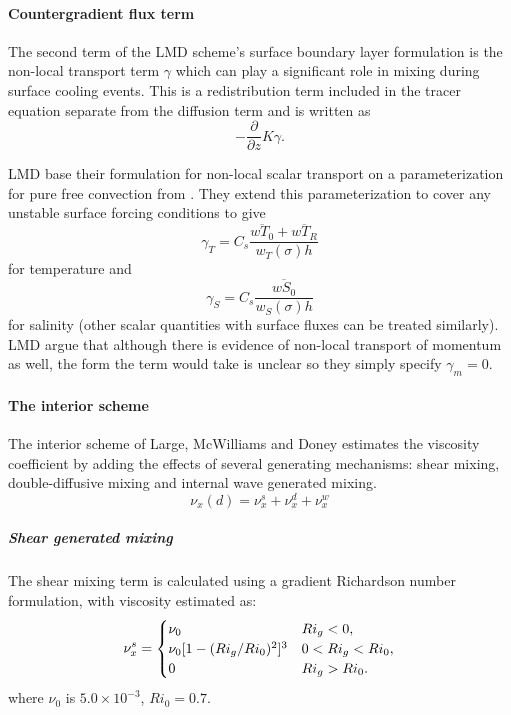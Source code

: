\paragraph{Countergradient flux term}
The second term of the LMD scheme's surface boundary layer
formulation is the non-local transport term $\gamma$ which can play a
significant role in mixing during surface cooling events.  This is a
redistribution term included in the tracer equation separate from the
diffusion term and is written as 
\begin{equation}
-\frac{\partial}{\partial z}K\gamma.
\end{equation}

LMD base their formulation for non-local scalar transport on a
parameterization for pure free convection from
\citet{Mailhot82}. They extend this parameterization to cover any
unstable surface forcing conditions to give
\begin{equation}
  \gamma_{T}=C_s\frac{\overline{wT_0}+
  \overline{wT_R}}{w_T(\sigma)h}
\end{equation}
for temperature and 
\begin{equation}
\gamma_S=C_s \frac{\overline{wS_0}}{w_S(\sigma)h}
\end{equation}
for salinity (other scalar quantities with surface fluxes can be
treated similarly). LMD argue that although there is evidence of
non-local transport of momentum as well, the form the term would take
is unclear so they simply specify $\gamma_m=0$.

\paragraph{The interior scheme}
The interior scheme of Large, McWilliams and Doney estimates the
viscosity coefficient by adding the effects of several generating
mechanisms:  shear mixing, double-diffusive mixing and internal wave
generated mixing.
\begin{equation}
\nu_{x}(d)=\nu_{x}^s+\nu_{x}^d+\nu_{x}^w
\end{equation}

\subparagraph{Shear generated mixing}
The shear mixing term is calculated using a
gradient Richardson number formulation,
with viscosity estimated as: 
\begin{equation}
\nu^s_x=\begin{cases}
\nu_0&   \text{$ Ri_g<0$}, \\
\nu_0[1-(Ri_g/Ri_0)^2]^3&  \text{$0< Ri_g<Ri_0$},  \\
0&   \text{$Ri_g>Ri_0$}.  
\end{cases}
\end{equation}
where $\nu_0$ is $5.0 \times 10^{-3}$, $Ri_0 = 0.7$.  


